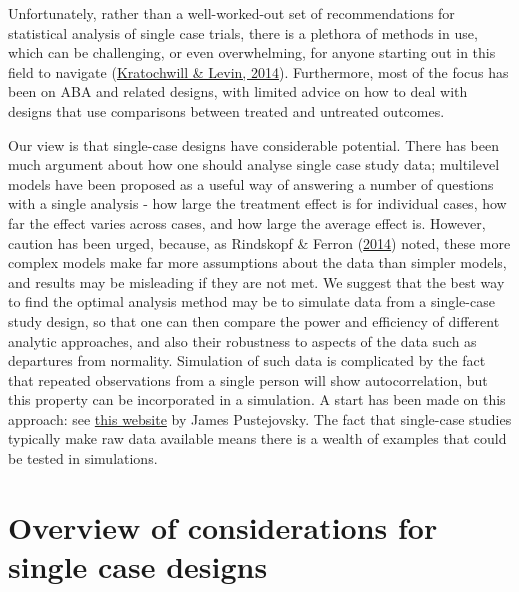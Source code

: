 \documentclass{krantz}
\begin{document}
Unfortunately, rather than a well-worked-out set of recommendations for statistical analysis of single case trials, there is a plethora of methods in use, which can be challenging, or even overwhelming, for anyone starting out in this field to navigate (\protect\hyperlink{ref-kratochwill2014c}{Kratochwill \& Levin, 2014}). Furthermore, most of the focus has been on ABA and related designs, with limited advice on how to deal with designs that use comparisons between treated and untreated outcomes.

Our view is that single-case designs have considerable potential. There has been much argument about how one should analyse single case study data; multilevel models have been proposed as a useful way of answering a number of questions with a single analysis - how large the treatment effect is for individual cases, how far the effect varies across cases, and how large the average effect is. However, caution has been urged, because, as Rindskopf \& Ferron (\protect\hyperlink{ref-rindskopf2014}{2014}) noted, these more complex models make far more assumptions about the data than simpler models, and results may be misleading if they are not met. We suggest that the best way to find the optimal analysis method may be to simulate data from a single-case study design, so that one can then compare the power and efficiency of different analytic approaches, and also their robustness to aspects of the data such as departures from normality. Simulation of such data is complicated by the fact that repeated observations from a single person will show autocorrelation, but this property can be incorporated in a simulation. A start has been made on this approach: see \href{https://www.jepusto.com/easily-simulate-thousands-of-single-case-designs/}{this website} by James Pustejovsky. The fact that single-case studies typically make raw data available means there is a wealth of examples that could be tested in simulations.

\hypertarget{overview-of-considerations-for-single-case-designs}{%
\section{Overview of considerations for single case designs}\label{overview-of-considerations-for-single-case-designs}}
\end{document}
